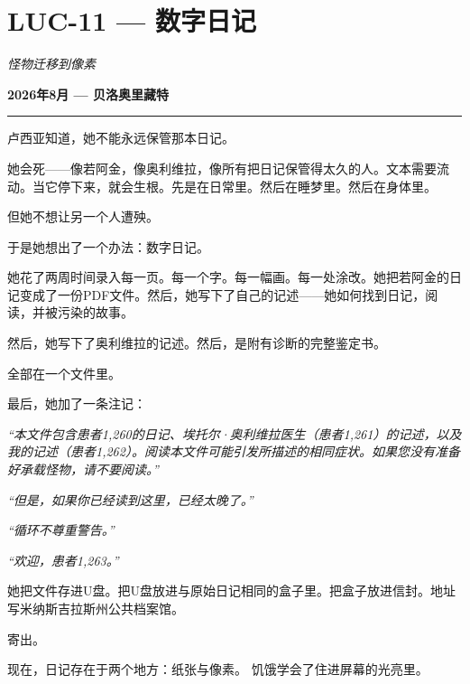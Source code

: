 \section*{\textbf{LUC-11} --- 数字日记}

\noindent \textit{怪物迁移到像素}

\noindent \textbf{2026年8月 --- 贝洛奥里藏特}

\vspace{0.5em}\noindent\rule{\textwidth}{0.5pt}\vspace{0.5em}

\noindent 卢西亚知道，她不能永远保管那本日记。

\noindent 她会死——像若阿金，像奥利维拉，像所有把日记保管得太久的人。文本需要流动。当它停下来，就会生根。先是在日常里。然后在睡梦里。然后在身体里。

\noindent 但她不想让另一个人遭殃。

\noindent 于是她想出了一个办法：数字日记。

\noindent 她花了两周时间录入每一页。每一个字。每一幅画。每一处涂改。她把若阿金的日记变成了一份PDF文件。然后，她写下了自己的记述——她如何找到日记，阅读，并被污染的故事。

\noindent 然后，她写下了奥利维拉的记述。然后，是附有诊断的完整鉴定书。

\noindent 全部在一个文件里。

\noindent 最后，她加了一条注记：

\noindent \textit{\textquotedblleft{}本文件包含患者1,260的日记、埃托尔·奥利维拉医生（患者1,261）的记述，以及我的记述（患者1,262）。阅读本文件可能引发所描述的相同症状。如果您没有准备好承载怪物，请不要阅读。\textquotedblright{}}

\noindent \textit{\textquotedblleft{}但是，如果你已经读到这里，已经太晚了。\textquotedblright{}}

\noindent \textit{\textquotedblleft{}循环不尊重警告。\textquotedblright{}}

\noindent \textit{\textquotedblleft{}欢迎，患者1,263。\textquotedblright{}}

\noindent 她把文件存进U盘。把U盘放进与原始日记相同的盒子里。把盒子放进信封。地址写米纳斯吉拉斯州公共档案馆。

\noindent 寄出。

\noindent 现在，日记存在于两个地方：纸张与像素。
\noindent 饥饿学会了住进屏幕的光亮里。

